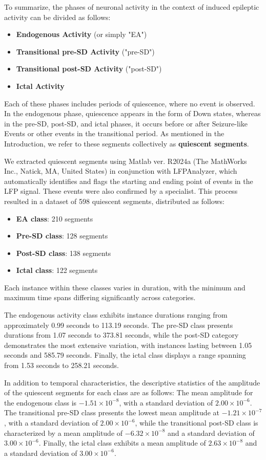 \documentclass{article}
\begin{document}
To summarize, the phases of neuronal activity in the context of induced epileptic activity can be divided as follows:
\begin{itemize}
    \item \textbf{Endogenous Activity} (or simply "EA")
    \item \textbf{Transitional pre-SD Activity} ("pre-SD")
    \item \textbf{Transitional post-SD Activity} ("post-SD")
    \item \textbf{Ictal Activity} 
\end{itemize}
Each of these phases includes periods of quiescence, where no event is observed. In the endogenous phase, quiescence appears in the form of Down states, whereas in the pre-SD, post-SD, and ictal phases, it occurs before or after Seizure-like Events or other events in the transitional period. As mentioned in the Introduction, we refer to these segments collectively as \textbf{quiescent segments}. 

We extracted quiescent segments using Matlab ver. R2024a (The MathWorks Inc., Natick, MA, United States) in conjunction with LFPAnalyzer, which automatically identifies and flags the starting and ending point of events in the LFP signal. These events were also confirmed by a specialist. This process resulted in a dataset of 598 quiescent segments, distributed as follows: 
\begin{itemize}
    \item \textbf{EA class}: 210 segments
    \item \textbf{Pre-SD class}: 128 segments
    \item \textbf{Post-SD class}: 138 segments
    \item \textbf{Ictal class}: 122 segments
\end{itemize}
Each instance within these classes varies in duration, with the minimum and maximum time spans differing significantly across categories.

The endogenous activity class exhibits instance durations ranging from approximately 0.99 seconds to 113.19 seconds. The pre-SD class presents durations from 1.07 seconds to 373.81 seconds, while the post-SD category demonstrates the most extensive variation, with instances lasting between 1.05 seconds and 585.79 seconds. Finally, the ictal class displays a range spanning from 1.53 seconds to 258.21 seconds.

In addition to temporal characteristics, the descriptive statistics of the amplitude of the quiescent segments for each class are as follows: The mean amplitude for the endogenous class is $-1.51 \times 10^{-8}$, with a standard deviation of $2.00 \times 10^{-6}$. The transitional pre-SD class presents the lowest mean amplitude at $-1.21 \times 10^{-7}$, with a standard deviation of $2.00 \times 10^{-6}$, while the transitional post-SD class is characterized by a mean amplitude of $-6.32 \times 10^{-8}$ and a standard deviation of $3.00 \times 10^{-6}$. Finally, the ictal class exhibits a mean amplitude of $2.63 \times 10^{-8}$ and a standard deviation of $3.00 \times 10^{-6}$. 
\end{document}
